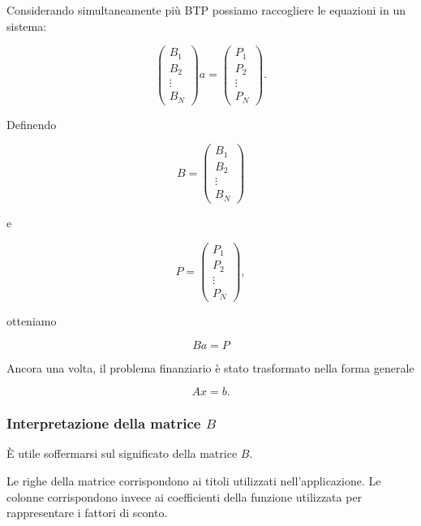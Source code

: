 Considerando simultaneamente più BTP possiamo raccogliere le
equazioni in un sistema:

\begin{equation*}
\begin{pmatrix}
B_1\\
B_2\\
\vdots\\
B_N
\end{pmatrix}
a
=
\begin{pmatrix}
P_1\\
P_2\\
\vdots\\
P_N
\end{pmatrix}.
\end{equation*}

Definendo

\begin{equation*}
B=
\begin{pmatrix}
B_1\\
B_2\\
\vdots\\
B_N
\end{pmatrix}
\end{equation*}

e

\begin{equation*}
P=
\begin{pmatrix}
P_1\\
P_2\\
\vdots\\
P_N
\end{pmatrix},
\end{equation*}

otteniamo

\begin{equation*}
    Ba=P
    \label{eq:BaP}
\end{equation*}

Ancora una volta, il problema finanziario è stato trasformato nella
forma generale

\begin{equation*}
    Ax=b.
\end{equation*}


\subsubsection{Interpretazione della matrice $B$}

È utile soffermarsi sul significato della matrice $B$.

Le righe della matrice corrispondono ai titoli utilizzati
nell'applicazione. Le colonne corrispondono invece ai coefficienti
della funzione utilizzata per rappresentare i fattori di sconto.

